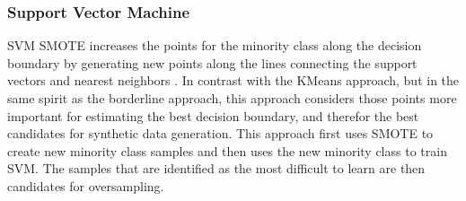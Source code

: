 \documentclass[letterpaper]{report}
\begin{document}
\subsubsection{Support Vector Machine}
SVM SMOTE increases the points for the minority class along the decision boundary by generating new points along the lines connecting the support vectors and nearest neighbors \cite{Nguyen2011-cb}. In contrast with the KMeans approach, but in the same spirit as the borderline approach, this approach considers those points more important for estimating the best decision boundary, and therefor the best candidates for synthetic data generation. This approach first uses SMOTE to create new minority class samples and then uses the new minority class to train SVM. The samples that are identified as the most difficult to learn are then candidates for oversampling.
\end{document}

